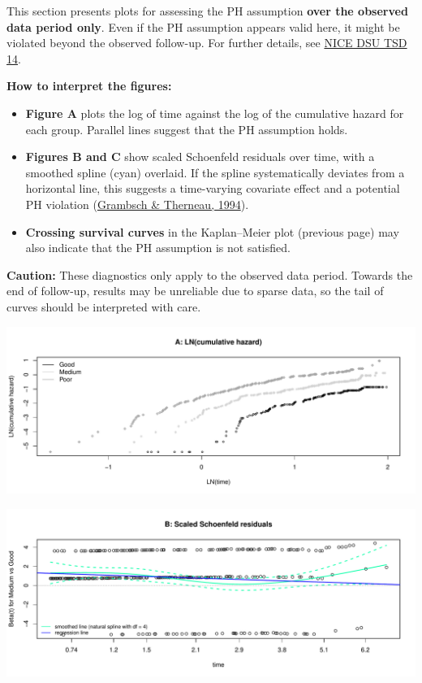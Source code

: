 \documentclass[
]{article}
\providecommand{\tightlist}{%
  \setlength{\itemsep}{0pt}\setlength{\parskip}{0pt}}
\begin{document}
This section presents plots for assessing the PH assumption \textbf{over
the observed data period only}. Even if the PH assumption appears valid
here, it might be violated beyond the observed follow-up. For further
details, see
\href{http://nicedsu.org.uk/wp-content/uploads/2016/03/NICE-DSU-TSD-Survival-analysis.updated-March-2013.v2.pdf}{NICE
DSU TSD 14}.

\textbf{How to interpret the figures:}

\begin{itemize}
\tightlist
\item
  \textbf{Figure A} plots the log of time against the log of the
  cumulative hazard for each group. Parallel lines suggest that the PH
  assumption holds.\\
\item
  \textbf{Figures B and C} show scaled Schoenfeld residuals over time,
  with a smoothed spline (cyan) overlaid. If the spline systematically
  deviates from a horizontal line, this suggests a time-varying
  covariate effect and a potential PH violation
  (\href{https://doi.org/10.1093/biomet/81.3.515}{Grambsch \& Therneau,
  1994}).\\
\item
  \textbf{Crossing survival curves} in the Kaplan--Meier plot (previous
  page) may also indicate that the PH assumption is not satisfied.
\end{itemize}

\textbf{Caution:} These diagnostics only apply to the observed data
period. Towards the end of follow-up, results may be unreliable due to
sparse data, so the tail of curves should be interpreted with care.

\clearpage

\begin{flushleft}\includegraphics[height=0.29\textheight]{BC_OS_output/Images/Figure_PH_assumption-1} \end{flushleft}

\begin{flushleft}\includegraphics[height=0.29\textheight]{BC_OS_output/Images/Figure_PH_assumption-2} \end{flushleft}
\end{document}
